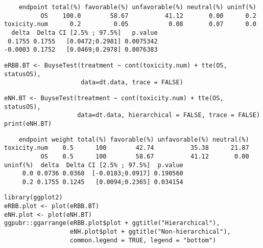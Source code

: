 \documentclass[12pt]{article}
\begin{document}
\begin{verbatim}
    endpoint total(%) favorable(%) unfavorable(%) neutral(%) uninf(%)
          OS    100.0        58.67          41.12       0.00      0.2
toxicity.num      0.2         0.05           0.08       0.07      0.0
  delta  Delta CI [2.5% ; 97.5%]   p.value
 0.1755 0.1755   [0.0472;0.2981] 0.0075342
-0.0003 0.1752   [0.0469;0.2978] 0.0076383
\end{verbatim}


\lstset{language=r,label= ,caption= ,captionpos=b,numbers=none}
\begin{lstlisting}
eRBB.BT <- BuyseTest(treatment ~ cont(toxicity.num) + tte(OS, statusOS),
                     data=dt.data, trace = FALSE)
\end{lstlisting}

\lstset{language=r,label= ,caption= ,captionpos=b,numbers=none}
\begin{lstlisting}
eNH.BT <- BuyseTest(treatment ~ cont(toxicity.num) + tte(OS, statusOS),
                    data=dt.data, hierarchical = FALSE, trace = FALSE)
print(eNH.BT)
\end{lstlisting}

\begin{verbatim}
    endpoint weight total(%) favorable(%) unfavorable(%) neutral(%)
toxicity.num    0.5      100        42.74          35.38      21.87
          OS    0.5      100        58.67          41.12       0.00
uninf(%)  delta  Delta CI [2.5% ; 97.5%]  p.value
     0.0 0.0736 0.0368  [-0.0183;0.0917] 0.190560
     0.2 0.1755 0.1245   [0.0094;0.2365] 0.034154
\end{verbatim}


\lstset{language=r,label= ,caption= ,captionpos=b,numbers=none}
\begin{lstlisting}
library(ggplot2)
eRBB.plot <- plot(eRBB.BT)
eNH.plot <- plot(eNH.BT)
ggpubr::ggarrange(eRBB.plot$plot + ggtitle("Hierarchical"),
                  eNH.plot$plot + ggtitle("Non-hierarchical"),
                  common.legend = TRUE, legend = "bottom")
\end{lstlisting}
\end{document}
